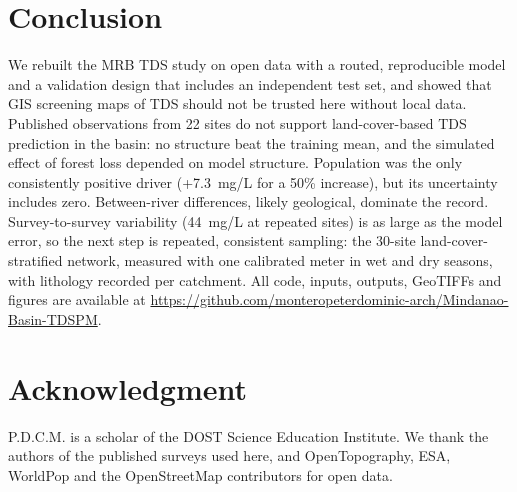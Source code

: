 \documentclass[10pt,twocolumn,letterpaper]{article}
\begin{document}
\section{Conclusion}
We rebuilt the MRB TDS study on open data with a routed, reproducible model and a validation design that includes an independent test set, and showed that GIS screening maps of TDS should not be trusted here without local data. Published observations from 22 sites do not support land-cover-based TDS prediction in the basin: no structure beat the training mean, and the simulated effect of forest loss depended on model structure. Population was the only consistently positive driver (+7.3~mg/L for a 50\% increase), but its uncertainty includes zero. Between-river differences, likely geological, dominate the record. Survey-to-survey variability (44~mg/L at repeated sites) is as large as the model error, so the next step is repeated, consistent sampling: the 30-site land-cover-stratified network, measured with one calibrated meter in wet and dry seasons, with lithology recorded per catchment. All code, inputs, outputs, GeoTIFFs and figures are available at \url{https://github.com/monteropeterdominic-arch/Mindanao-Basin-TDSPM}.

\section*{Acknowledgment}
P.D.C.M. is a scholar of the DOST Science Education Institute. We thank the authors of the published surveys used here, and OpenTopography, ESA, WorldPop and the OpenStreetMap contributors for open data.
\end{document}
